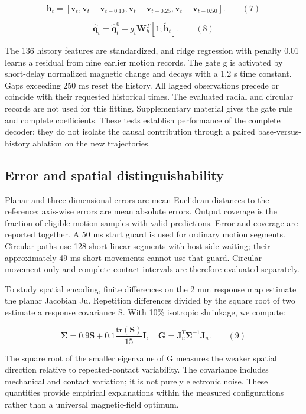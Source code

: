 \documentclass[preprint,12pt]{elsarticle}
\begin{document}
\[\mathbf{h}_t=[\mathbf{v}_t,\mathbf{v}_t-\mathbf{v}_{t-0.10},\mathbf{v}_t-\mathbf{v}_{t-0.25},\mathbf{v}_t-\mathbf{v}_{t-0.50}].\qquad (7)\]

\[\widehat{\mathbf{q}}_t=\widehat{\mathbf{q}}_t^0+g_t\mathbf{W}_h^T[1;\widetilde{\mathbf{h}}_t].\qquad (8)\]

The 136 history features are standardized, and ridge regression with penalty 0.01 learns a residual from nine earlier motion records. The gate g is activated by short-delay normalized magnetic change and decays with a 1.2 s time constant. Gaps exceeding 250 ms reset the history. All lagged observations precede or coincide with their requested historical times. The evaluated radial and circular records are not used for this fitting. Supplementary material gives the gate rule and complete coefficients. These tests establish performance of the complete decoder; they do not isolate the causal contribution through a paired base-versus-history ablation on the new trajectories.

\subsection{Error and spatial distinguishability}

Planar and three-dimensional errors are mean Euclidean distances to the reference; axis-wise errors are mean absolute errors. Output coverage is the fraction of eligible motion samples with valid predictions. Error and coverage are reported together. A 50 ms start guard is used for ordinary motion segments. Circular paths use 128 short linear segments with host-side waiting; their approximately 49 ms short movements cannot use that guard. Circular movement-only and complete-contact intervals are therefore evaluated separately.

To study spatial encoding, finite differences on the 2 mm response map estimate the planar Jacobian Ju. Repetition differences divided by the square root of two estimate a response covariance S. With 10\% isotropic shrinkage, we compute:

\[\boldsymbol{\Sigma}=0.9\mathbf{S}+0.1\frac{\mathrm{tr}(\mathbf{S})}{15}\mathbf{I},\quad\mathbf{G}=\mathbf{J}_u^T\boldsymbol{\Sigma}^{-1}\mathbf{J}_u.\qquad (9)\]

The square root of the smaller eigenvalue of G measures the weaker spatial direction relative to repeated-contact variability. The covariance includes mechanical and contact variation; it is not purely electronic noise. These quantities provide empirical explanations within the measured configurations rather than a universal magnetic-field optimum.
\end{document}
